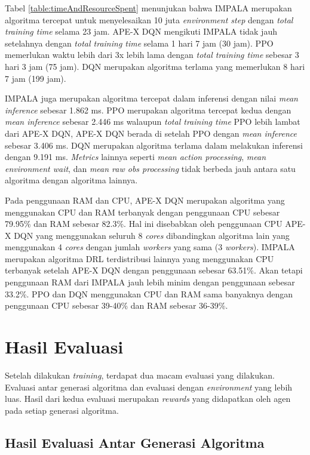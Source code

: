 Tabel \ref{table:timeAndResourceSpent} menunjukan bahwa IMPALA merupakan algoritma tercepat
untuk menyelesaikan 10 juta \emph{environment step} dengan \emph{total training time} selama
23 jam. APE-X DQN mengikuti IMPALA tidak jauh setelahnya dengan \emph{total training time}
selama 1 hari 7 jam (30 jam). PPO memerlukan waktu lebih dari 3x lebih lama dengan \emph{total training time}
sebesar 3 hari 3 jam (75 jam). DQN merupakan algoritma terlama yang memerlukan 8 hari 7 jam (199 jam).

IMPALA juga merupakan algoritma tercepat dalam inferensi dengan nilai \emph{mean inference} sebesar
1.862 ms. PPO merupakan algoritma tercepat kedua dengan \emph{mean inference} sebesar 2.446 ms walaupun \emph{total
training time} PPO lebih lambat dari APE-X DQN, APE-X DQN berada di setelah PPO dengan \emph{mean inference}
sebesar 3.406 ms. DQN merupakan algoritma terlama dalam melakukan inferensi dengan 9.191 ms.
\emph{Metrics} lainnya seperti \emph{mean action processing}, \emph{mean environment wait}, dan \emph{mean raw obs processing}
tidak berbeda jauh antara satu algoritma dengan algoritma lainnya.

Pada penggunaan RAM dan CPU, APE-X DQN merupakan algoritma yang menggunakan CPU dan RAM terbanyak
dengan penggunaan CPU sebesar 79.95\% dan RAM sebesar 82.3\%. Hal ini disebabkan oleh penggunaan CPU
APE-X DQN yang menggunakan seluruh 8 \emph{cores} dibandingkan algoritma lain yang menggunakan 4 \emph{cores}
dengan jumlah \emph{workers} yang sama (3 \emph{workers}). IMPALA merupakan algoritma DRL
terdistribusi lainnya yang menggunakan CPU terbanyak setelah APE-X DQN dengan penggunaan sebesar
63.51\%. Akan tetapi penggunaan RAM dari IMPALA jauh lebih minim dengan penggunaan sebesar 33.2\%.
PPO dan DQN menggunakan CPU dan RAM sama banyaknya dengan penggunaan CPU sebesar 39-40\% dan RAM
sebesar 36-39\%.

\section{Hasil Evaluasi}
Setelah dilakukan \emph{training}, terdapat dua macam evaluasi yang dilakukan.
Evaluasi antar generasi algoritma dan evaluasi dengan \emph{environment} yang lebih luas.
Hasil dari kedua evaluasi merupakan \emph{rewards} yang didapatkan oleh agen pada setiap generasi algoritma.

\subsection{Hasil Evaluasi Antar Generasi Algoritma}

